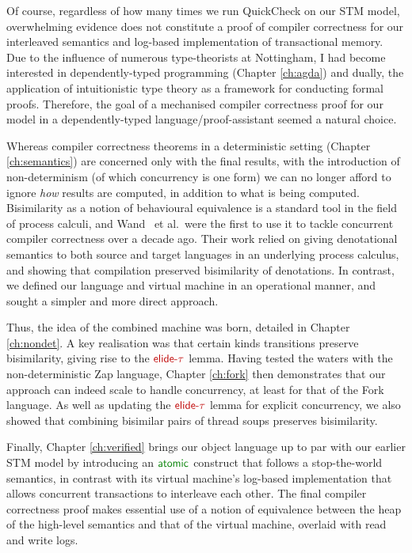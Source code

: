 Of course, regardless of how many times we run QuickCheck on our STM model,
overwhelming evidence does not constitute a proof of compiler correctness
for our interleaved semantics and log-based implementation of transactional
memory. Due to the influence of numerous type-theorists at Nottingham, I had
become interested in dependently-typed programming (Chapter \ref{ch:agda})
and dually, the application of intuitionistic type theory as a framework for
conducting formal proofs. Therefore, the goal of a mechanised compiler
correctness proof for our model in a dependently-typed
language/proof-assistant seemed a natural choice.

Whereas compiler correctness theorems in a deterministic setting (Chapter
\ref{ch:semantics}) are concerned only with the final results, with the
introduction of non-determinism (of which concurrency is one form) we can no
longer afford to ignore \emph{how} results are computed, in addition to what
is being computed. Bisimilarity as a notion of behavioural equivalence is
a standard tool in the field of process calculi, and
Wand~\cite{wand95-parallel,wand95-denotational,gladstein96-concurrent} et
al.~were the first to use it to tackle concurrent compiler correctness over
a decade ago. Their work relied on giving denotational semantics to both
source and target languages in an underlying process calculus, and showing
that compilation preserved bisimilarity of denotations. In contrast, we
defined our language and virtual machine in an operational manner, and
sought a simpler and more direct approach.

Thus, the idea of the combined machine was born, detailed in Chapter
\ref{ch:nondet}. A key realisation was that certain kinds transitions
preserve bisimilarity, giving rise to the $\func{elide\text-\tau}$ lemma.
Having tested the waters with the non-deterministic Zap language, Chapter
\ref{ch:fork} then demonstrates that our approach can indeed scale to handle
concurrency, at least for that of the Fork language. As well as updating the
$\func{elide\text-\tau}$ lemma for explicit concurrency, we also showed that
combining bisimilar pairs of thread soups preserves bisimilarity.

Finally, Chapter \ref{ch:verified} brings our object language up to par with
our earlier STM model by introducing an $\cons{atomic}$ construct that
follows a stop-the-world semantics, in contrast with its virtual machine's
log-based implementation that allows concurrent transactions to interleave
each other. The final compiler correctness proof makes essential use of
a notion of equivalence between the heap of the high-level semantics and
that of the virtual machine, overlaid with read and write logs.

